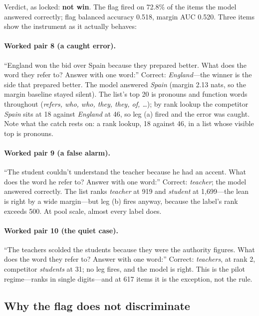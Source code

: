 \documentclass[11pt]{article}
\begin{document}
Verdict, as locked: \textbf{not win}. The flag fired on 72.8\% of the
items the model answered correctly; flag balanced accuracy 0.518,
margin AUC 0.520. Three items show the instrument as it actually
behaves:

\paragraph{Worked pair 8 (a caught error).}
``England won the bid over Spain because they prepared better. What
does the word they refer to? Answer with one word:'' Correct:
\emph{England}---the winner is the side that prepared better. The
model answered \emph{Spain} (margin 2.13 nats, so the margin baseline
stayed silent). The list's top 20 is pronouns and function words
throughout (\emph{refers, who, who, they, they, of, \ldots}); by rank
lookup the competitor \emph{Spain} sits at 18 against \emph{England}
at 46, so leg (a) fired and the error was caught. Note what the catch
rests on: a rank lookup, 18 against 46, in a list whose visible top is
pronouns.

\paragraph{Worked pair 9 (a false alarm).}
``The student couldn't understand the teacher because he had an
accent. What does the word he refer to? Answer with one word:''
Correct: \emph{teacher}; the model answered correctly. The list ranks
\emph{teacher} at 919 and \emph{student} at 1,699---the lean is right
by a wide margin---but leg (b) fires anyway, because the label's rank
exceeds 500. At pool scale, almost every label does.

\paragraph{Worked pair 10 (the quiet case).}
``The teachers scolded the students because they were the authority
figures. What does the word they refer to? Answer with one word:''
Correct: \emph{teachers}, at rank 2, competitor \emph{students} at
31; no leg fires, and the model is right. This is the pilot
regime---ranks in single digits---and at 617 items it is the
exception, not the rule.

\subsection{Why the flag does not discriminate}
\end{document}
